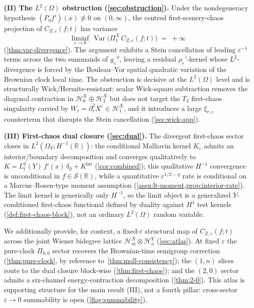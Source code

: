 \documentclass[EJP]{ejpecp}
\newcommand{\R}{\mathbb{R}}
\newcommand{\Hilb}{\mathcal{H}}
\newcommand{\IBM}{Z}
\newcommand{\Pir}{\Pi}
\DeclareMathOperator{\Var}{Var}
\begin{document}
\smallskip
\noindent\textbf{(II) The $L^{2}(\Omega)$ obstruction
(\cref{sec:obstruction}).}
Under the nondegeneracy hypothesis $(P_\eta f')(x)\not\equiv 0$ on
$(0,\infty)$, the centred first-scenery-chaos projection of
$C_{\IBM,\varepsilon}(f;t)$ has variance
\begin{equation}\label{eq:obstr-intro}
  \liminf_{\varepsilon\to 0}\,
   \Var\bigl(\Pir_1^{X}\,C_{\IBM,\varepsilon}(f;t)\bigr)
   \;=\;+\infty
\end{equation}
(\cref{thm:var-divergence}). The argument exhibits a Stein
cancellation of leading $\varepsilon^{-1}$ terms across the
two summands of $g_\varepsilon''$, leaving a residual
$\rho_\varepsilon'$-kernel whose $L^{2}$-divergence is forced by the
Bouleau--Yor spatial quadratic variation of the Brownian clock
local time. The obstruction is decisive at the $L^{2}(\Omega)$
level and is structurally Wick/Hermite-resistant: scalar
Wick-square subtraction removes the diagonal contraction in
$\Hilb_0^X\oplus\Hilb_2^X$ but does not target the $T_3$
first-chaos singularity carried by
$W_r=\partial_r^{2}X^\varepsilon\in\Hilb_1^X$, and it introduces a
large $\xi_{r,\varepsilon}$ counterterm that disrupts the Stein
cancellation (\cref{sec:wick-app}).

\smallskip
\noindent\textbf{(III) First-chaos dual closure (\cref{sec:dual}).}
The divergent first-chaos sector closes in
$L^{2}(\Omega_{Y};H^{-1}(\R))$: the conditional Malliavin kernel
$K_{\varepsilon}$ admits an interior/boundary decomposition and
converges qualitatively to
$K=L_t^{0}(Y)\,f'(x)\,\delta_0+K^{\mathrm{int}}$
(\cref{cor:combined}); this qualitative $H^{-1}$ convergence is
unconditional in $f\in\mathscr S(\R)$, while a quantitative
$\varepsilon^{1/2-\eta}$ rate is conditional on a Marcus--Rosen-type
moment assumption (\cref{assu:lt-moment,prop:interior-rate}). The
limit kernel is generically only $H^{-1}$, so the limit object is a
generalized $Y$-conditioned first-chaos functional defined by
duality against $H^{1}$ test kernels
(\cref{def:first-chaos-block}), not an ordinary $L^{2}(\Omega)$
random variable.

\smallskip
We additionally provide, for context, a fixed-$\varepsilon$
structural map of $C_{\IBM,\varepsilon}(f;t)$ across the joint
Wiener bidegree lattice $\Hilb_m^X\otimes\Hilb_n^Y$
(\cref{sec:atlas}). At fixed $\varepsilon$ the pure-clock
$\Pir_{0,0}$ sector recovers the Brownian-time semigroup correction
(\cref{thm:pure-clock}, by reference to~\cref{thm:moll-consistency});
the $(1,n)$ slices route to the dual closure block-wise
(\cref{thm:first-chaos}); and the $(2,0)$ sector admits a
six-channel energy-contraction decomposition (\cref{thm:2-0}). This
atlas is supporting structure for the main result (III), not a
fourth pillar: cross-sector $\varepsilon\to 0$ summability is open
(\cref{flag:summability}).
\end{document}
